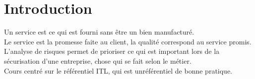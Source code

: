 \section{Introduction}
Un service est ce qui est fourni sans \^etre un bien manufactur\'e.\\
Le service est la promesse faite au client, la qualit\'e correspond au service promis.\\
L'analyse de risques permet de prioriser ce qui est important lors de la s\'ecurisation d'une entreprise, chose qui se
fait selon le m\'etier.\\
Cours centr\'e sur le r\'ef\'erentiel ITL, qui est unr\'ef\'erentiel de bonne pratique.
